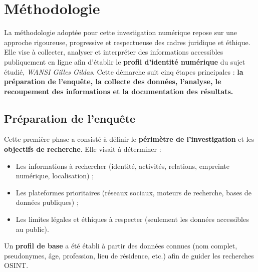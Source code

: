 \documentclass[memoire, 12pt]{report}
\begin{document}
\section{Méthodologie}
La méthodologie adoptée pour cette investigation numérique repose sur une approche rigoureuse, progressive et respectueuse des cadres juridique et éthique. Elle vise à collecter, analyser et interpréter des informations accessibles publiquement en ligne afin d’établir le \textbf{profil d’identité numérique} du sujet étudié, \textit{WANSI Gilles Gildas}.  
Cette démarche suit cinq étapes principales : \textbf{la préparation de l’enquête, la collecte des données, l’analyse, le recoupement des informations et la documentation des résultats.}

\subsection{Préparation de l’enquête}
Cette première phase a consisté à définir le \textbf{périmètre de l’investigation} et les \textbf{objectifs de recherche}.  
Elle visait à déterminer :
\begin{itemize}
    \item Les informations à rechercher (identité, activités, relations, empreinte numérique, localisation) ;
    \item Les plateformes prioritaires (réseaux sociaux, moteurs de recherche, bases de données publiques) ;
    \item Les limites légales et éthiques à respecter (seulement les données accessibles au public).
\end{itemize}

Un \textbf{profil de base} a été établi à partir des données connues (nom complet, pseudonymes, âge, profession, lieu de résidence, etc.) afin de guider les recherches OSINT.  
\end{document}
